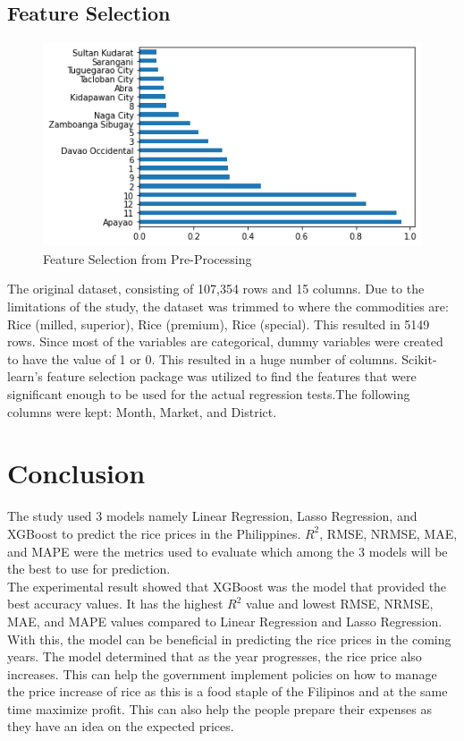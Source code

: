 \documentclass[runningheads]{llncs}
\begin{document}
\subsection{Feature Selection}
\begin{figure}
	\includegraphics[width=\textwidth]{FIGURES/feature_select.png}
	\caption{Feature Selection from Pre-Processing} \label{fig1}
\end{figure}
	The original dataset, consisting of 107,354 rows and 15 columns. Due to the limitations of the study, the dataset was trimmed to where the commodities are: Rice (milled, superior), Rice (premium), Rice (special). This resulted in 5149 rows. Since most of the variables are categorical, dummy variables were created to have the value of 1 or 0. This resulted in a huge number of columns. Scikit-learn’s feature selection package was utilized to find the features that were significant enough to be used for the actual regression tests.The following columns were kept: Month, Market, and District. 


\section{Conclusion}
The study used 3 models namely Linear Regression, Lasso Regression, and XGBoost to predict the rice prices in the Philippines. $R^2$, RMSE, NRMSE, MAE, and MAPE were the metrics used to evaluate which among the 3 models will be the best to use for prediction.\\

The experimental result showed that XGBoost was the model that provided the best accuracy values. It has the highest $R^2$ value and lowest RMSE, NRMSE, MAE, and MAPE values  compared to Linear Regression and Lasso Regression. \\

With this, the model can be beneficial in predicting the rice prices in the coming years. The model determined that as the year progresses, the rice price also increases. This can help the government implement policies on how to manage the price increase of rice as this is a food staple of the Filipinos and at the same time maximize profit. This can also help the people prepare their expenses as they have an idea on the expected prices.\\
\end{document}
